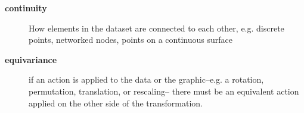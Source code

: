 \documentclass[../main.tex]{subfiles}
\begin{document}
\begin{mdframed}[roundcorner=10pt, frametitle=Structure, frametitlerule=true, frametitlebackgroundcolor=gray!10]
    \begin{description}
        \item[\textbf{continuity}] How elements in the dataset are connected to each other, e.g. discrete points, networked nodes, points on a continuous surface
        \item[\textbf{equivariance}] if an action is applied to the data or the graphic--e.g. a rotation, permutation, translation, or rescaling-- there must be an equivalent action applied on the other side of the transformation. 
    \end{description}
\end{mdframed}
\end{document}
